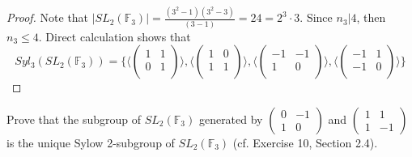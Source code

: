 \documentclass{article}
\newcommand{\F}{\mathbb{F}}
\newenvironment{problem}[2][Problem]{\begin{trivlist}
\item[\hskip \labelsep {\bfseries #1}\hskip \labelsep {\bfseries #2.}]}{\end{trivlist}}
\begin{document}
\begin{proof}
    Note that $|SL_2(\F_3)|=\frac{(3^2-1)(3^2-3)}{(3-1)}=24=2^3\cdot 3$. Since $n_3|4$, then $n_3\leq 4$. Direct calculation shows that 
    \[
    Syl_3(SL_2(\mathbb{F}_3)) = \bigg\{\bigg\langle\begin{pmatrix}
         1 & 1 \\
         0 & 1\\
    \end{pmatrix}\bigg\rangle, \bigg\langle\begin{pmatrix}
         1 & 0 \\
         1 & 1\\
    \end{pmatrix}\bigg\rangle, \bigg\langle\begin{pmatrix}
         -1 & -1 \\
         1 & 0\\
    \end{pmatrix}\bigg\rangle, \bigg\langle\begin{pmatrix}
         -1 & 1 \\
         -1 & 0\\
    \end{pmatrix}\bigg\rangle \bigg\}
    \]
\end{proof}
\begin{problem}{10}
    Prove that the subgroup of $SL_2(\mathbb{F}_3)$ generated by  
    $\begin{pmatrix}
    0 & -1 \\
    1 & 0
    \end{pmatrix}$  
    and  
    $\begin{pmatrix}
    1 & 1 \\
    1 & -1
    \end{pmatrix}$  
    is the unique Sylow 2-subgroup of $SL_2(\mathbb{F}_3)$ (cf. Exercise 10, Section 2.4).
\end{problem}
\end{document}
